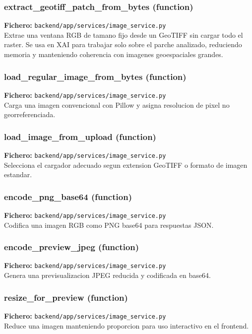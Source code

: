 \subsubsection*{extract\_geotiff\_patch\_from\_bytes (function)}
\noindent\textbf{Fichero:} \texttt{backend/app/services/image\_service.py}\\
Extrae una ventana RGB de tamano fijo desde un GeoTIFF sin cargar todo el raster. Se usa en XAI para trabajar solo sobre el parche analizado, reduciendo memoria y manteniendo coherencia con imagenes geoespaciales grandes.


\subsubsection*{load\_regular\_image\_from\_bytes (function)}
\noindent\textbf{Fichero:} \texttt{backend/app/services/image\_service.py}\\
Carga una imagen convencional con Pillow y asigna resolucion de pixel no georreferenciada.


\subsubsection*{load\_image\_from\_upload (function)}
\noindent\textbf{Fichero:} \texttt{backend/app/services/image\_service.py}\\
Selecciona el cargador adecuado segun extension GeoTIFF o formato de imagen estandar.


\subsubsection*{encode\_png\_base64 (function)}
\noindent\textbf{Fichero:} \texttt{backend/app/services/image\_service.py}\\
Codifica una imagen RGB como PNG base64 para respuestas JSON.


\subsubsection*{encode\_preview\_jpeg (function)}
\noindent\textbf{Fichero:} \texttt{backend/app/services/image\_service.py}\\
Genera una previsualizacion JPEG reducida y codificada en base64.


\subsubsection*{resize\_for\_preview (function)}
\noindent\textbf{Fichero:} \texttt{backend/app/services/image\_service.py}\\
Reduce una imagen manteniendo proporcion para uso interactivo en el frontend.



